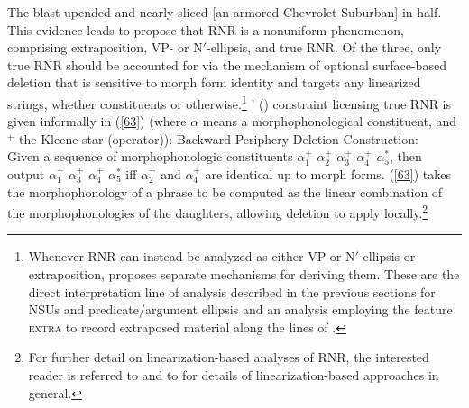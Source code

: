 \ex The blast upended and nearly sliced [an armored Chevrolet Suburban] in half.\label{62}\zl
%
This evidence leads \citet{Chaves2014} to propose that RNR is a nonuniform phenomenon, comprising extraposition,  VP- or N$'$-ellipsis, and true RNR.
%
%
%
Of the three, only true RNR should be accounted for via the mechanism of optional surface-based deletion that is sensitive to morph form identity and targets any linearized strings, whether constituents or otherwise.\footnote{Whenever RNR can instead be analyzed as either VP or N$'$-ellipsis or extraposition, \citet{Chaves2014} proposes separate mechanisms for deriving them. These are the direct interpretation line of analysis described in the previous sections for NSUs and predicate/argument ellipsis and an analysis employing the feature \textsc{extra} to record extraposed material along the lines of \citet{KimSag2005, Kay2012}.} \citeauthor{Chaves2014}' (\citeyear[874]{Chaves2014}) constraint licensing true RNR is given informally in (\ref{63}) (where $\alpha$ means a morphophonological constituent, and $^{+}$ the Kleene star (operator)):
%
%
%
\ea
\label{63}
 Backward Periphery Deletion Construction:\\

Given a sequence of morphophonologic constituents $\alpha_{1}^{+}$ $\alpha_{2}^{+}$ $\alpha_{3}^{+}$ $\alpha_{4}^{+}$ $\alpha_{5}^{*}$, then output
$\alpha_{1}^{+}$ $\alpha_{3}^{+}$ $\alpha_{4}^{+}$ $\alpha_{5}^{*}$
iff $\alpha_{2}^{+}$ and $\alpha_{4}^{+}$ are identical up to morph forms.
\z
(\ref{63}) takes the morphophonology of a phrase to be computed as the linear combination of the morphophonologies of the daughters, allowing deletion to apply locally.\footnote{For further detail on linearization-based analyses of RNR, the interested reader is referred to \citet{Yatabe2001, Yatabe2012} and to  for details of linearization-based approaches in general.}




